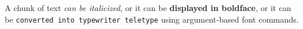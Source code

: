 A chunk of text \textit{can be italicized}, or it can be \textbf{displayed in boldface}, or it can be \texttt{converted into typewriter teletype} using argument-based font commands.